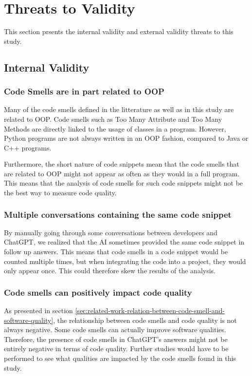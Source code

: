 \section{Threats to Validity}
\label{sec:threats-to-validity}
This section prsents the internal validity and external validity threats to this study.

\subsection{Internal Validity}
\label{sec:threats-to-validity-internal}
\subsubsection{Code Smells are in part related to OOP}
Many of the code smells defined in the litterature as well as in this study are related to OOP. Code smells such as Too Many Attribute and Too Many Methods are directly linked to the usage of classes in a program. However, Python programs are not always written in an OOP fashion, compared to Java or C++ programs.

Furthermore, the short nature of code snippets mean that the code smells that are related to OOP might not appear as often as they would in a full program. This means that the analysis of code smells for such code snippets might not be the best way to measure code quality. \\

\subsubsection{Multiple conversations containing the same code snippet}
By manually going through some conversations between developers and ChatGPT, we realized that the AI sometimes provided the same code snippet in follow up answers. This means that code smells in a code snippet would be counted multiple times, but when integrating the code into a project, they would only appear once. This could therefore skew the results of the analysis. \\

\subsubsection{Code smells can positively impact code quality}
As presented in section \ref{sec:related-work-relation-between-code-smell-and-software-quality}, the relationship between code smells and code quality is not always negative. Some code smells can actually improve software qualities. Therefore, the presence of code smells in ChatGPT's answers might not be entirely negative in terms of code quality. Further studies would have to be performed to see what qualities are impacted by the code smells found in this study. \\

